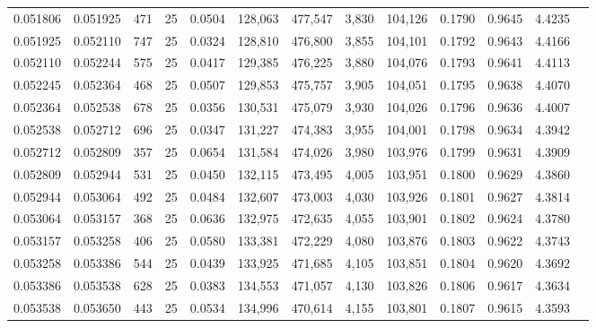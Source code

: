 \begin{tabular}{rrrrrrrrrrrrr}
0.051806 & 0.051925 &   471 &  25 &                                     0.0504 & 128,063 & 477,547 &   3,830 & 104,126 & 0.1790 & 0.9645 & 4.4235 \\
0.051925 & 0.052110 &   747 &  25 &                                     0.0324 & 128,810 & 476,800 &   3,855 & 104,101 & 0.1792 & 0.9643 & 4.4166 \\
0.052110 & 0.052244 &   575 &  25 &                                     0.0417 & 129,385 & 476,225 &   3,880 & 104,076 & 0.1793 & 0.9641 & 4.4113 \\
0.052245 & 0.052364 &   468 &  25 &                                     0.0507 & 129,853 & 475,757 &   3,905 & 104,051 & 0.1795 & 0.9638 & 4.4070 \\
0.052364 & 0.052538 &   678 &  25 &                                     0.0356 & 130,531 & 475,079 &   3,930 & 104,026 & 0.1796 & 0.9636 & 4.4007 \\
0.052538 & 0.052712 &   696 &  25 &                                     0.0347 & 131,227 & 474,383 &   3,955 & 104,001 & 0.1798 & 0.9634 & 4.3942 \\
0.052712 & 0.052809 &   357 &  25 &                                     0.0654 & 131,584 & 474,026 &   3,980 & 103,976 & 0.1799 & 0.9631 & 4.3909 \\
0.052809 & 0.052944 &   531 &  25 &                                     0.0450 & 132,115 & 473,495 &   4,005 & 103,951 & 0.1800 & 0.9629 & 4.3860 \\
0.052944 & 0.053064 &   492 &  25 &                                     0.0484 & 132,607 & 473,003 &   4,030 & 103,926 & 0.1801 & 0.9627 & 4.3814 \\
0.053064 & 0.053157 &   368 &  25 &                                     0.0636 & 132,975 & 472,635 &   4,055 & 103,901 & 0.1802 & 0.9624 & 4.3780 \\
0.053157 & 0.053258 &   406 &  25 &                                     0.0580 & 133,381 & 472,229 &   4,080 & 103,876 & 0.1803 & 0.9622 & 4.3743 \\
0.053258 & 0.053386 &   544 &  25 &                                     0.0439 & 133,925 & 471,685 &   4,105 & 103,851 & 0.1804 & 0.9620 & 4.3692 \\
0.053386 & 0.053538 &   628 &  25 &                                     0.0383 & 134,553 & 471,057 &   4,130 & 103,826 & 0.1806 & 0.9617 & 4.3634 \\
0.053538 & 0.053650 &   443 &  25 &                                     0.0534 & 134,996 & 470,614 &   4,155 & 103,801 & 0.1807 & 0.9615 & 4.3593 \\

\end{tabular}
